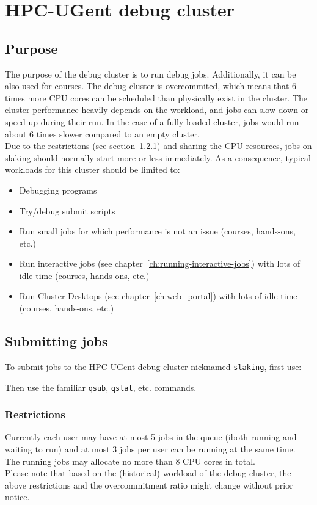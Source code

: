 \chapter{HPC-UGent debug cluster}
\label{ch:debug_ugent}


\section{Purpose}
\label{sec:debug_ugent_pupose}
The purpose of the debug cluster is to run debug jobs. Additionally, it can be also used for courses. 
The debug cluster is overcommited, which means that 6 times more CPU cores can be
scheduled than physically exist in the cluster. The cluster performance heavily depends on the
workload, and jobs can slow down or speed up during their run. In the case of a
fully loaded cluster, jobs would run about 6 times slower compared to an empty cluster. 
\\ Due to the restrictions (see section~\ref{subsec:debug_ugent_restrictions}) and sharing the CPU
resources, jobs on slaking should normally start more or less immediately. As a consequence,
typical workloads for this cluster should be limited to:
\begin{itemize}
  \item  Debugging programs
  \item  Try/debug submit scripts
  \item  Run small jobs for which performance is not an issue (courses, hands-ons, etc.)
  \item  Run interactive jobs (see chapter~\ref{ch:running-interactive-jobs}) with lots of idle time
         (courses, hands-ons, etc.) 
  \item  Run Cluster Desktops (see chapter~\ref{ch:web_portal}) with lots of idle time
         (courses, hands-ons, etc.)
\end{itemize} 

\section{Submitting jobs}
\label{sec:debug_ugent_jobs}

To submit jobs to the HPC-UGent debug cluster nicknamed \lstinline|slaking|, first use:

\begin{prompt}
\end{prompt}

Then use the familiar \lstinline|qsub|, \lstinline|qstat|, etc. commands.

\subsection{Restrictions}
\label{subsec:debug_ugent_restrictions}

Currently each user may have at most 5 jobs in the queue (iboth running and waiting to run)
and at most 3 jobs per user can be running at the same time. The running jobs may allocate 
no more than 8 CPU cores in total. \\ Please note that based on the (historical) workload
of the debug cluster, the above restrictions and the overcommitment ratio might change
without prior notice.
